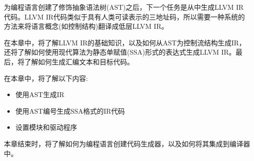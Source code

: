 
为编程语言创建了修饰抽象语法树(AST)之后，下一个任务是从中生成LLVM IR代码。LLVM IR代码类似于具有人类可读表示的三地址码，所以需要一种系统的方法来将语言概念(如控制结构)翻译成低层LLVM IR。

在本章中，将了解LLVM IR的基础知识，以及如何从AST为控制流结构生成IR，还将了解如何使用现代算法为静态单赋值(SSA)形式的表达式生成LLVM IR。最后，将了解如何生成汇编文本和目标代码。

在本章中，将了解以下内容:

\begin{itemize}
\item
使用AST生成IR

\item
使用AST编号生成SSA格式的IR代码

\item
设置模块和驱动程序
\end{itemize}

本章结束时，将了解如何为编程语言创建代码生成器，以及如何将其集成到编译器中。

